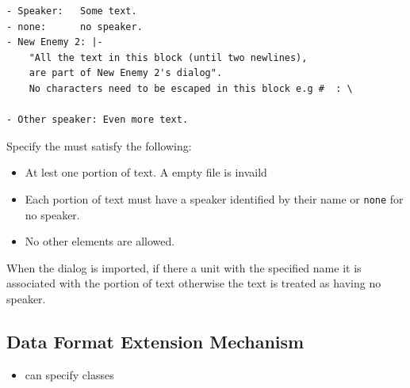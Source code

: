 \begin{lstlisting}[caption=A example show the features of the dialog's data format]
- Speaker:   Some text.
- none:      no speaker.
- New Enemy 2: |-
    "All the text in this block (until two newlines),
    are part of New Enemy 2's dialog". 
    No characters need to be escaped in this block e.g #  : \

- Other speaker: Even more text.
\end{lstlisting}
Specify the must satisfy the following:
\begin{itemize}
	\item  At lest one portion of text. A empty file is invaild
	\item  Each portion of text must have a speaker identified by their name or \texttt{none} for no speaker.
	\item  No other elements are allowed.
\end{itemize}

When the dialog is imported, if there a unit with  the specified name it is associated with the  portion of text otherwise the text is treated as having no speaker.


\subsection{Data Format Extension Mechanism}
\label{sub:data_format_extension_mechanism}


\begin{itemize}
	\item can specify classes
\end{itemize}